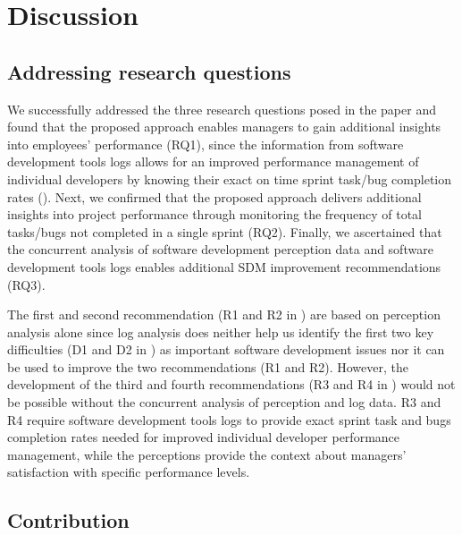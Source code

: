 \section{Discussion}

\subsection{Addressing research questions}

We successfully addressed the three research questions posed in the paper and found that the proposed approach enables managers to gain additional insights into employees’ performance (RQ1), since the information from software development tools logs allows for an improved performance management of individual developers by knowing their exact on time sprint task/bug completion rates (). Next, we confirmed that the proposed approach delivers additional insights into project performance through monitoring the frequency of total tasks/bugs not completed in a single sprint (RQ2). Finally, we ascertained that the concurrent analysis of software development perception data and software development tools logs enables additional SDM improvement recommendations (RQ3). 

The first and second recommendation (R1 and R2 in ) are based on perception analysis alone since log analysis does neither help us identify the first two key difficulties (D1 and D2 in ) as important software development issues nor it can be used to improve the two recommendations (R1 and R2). However, the development of the third and fourth recommendations (R3 and R4 in ) would not be possible without the concurrent analysis of perception and log data.  R3 and R4 require software development tools logs to provide exact sprint task and bugs completion rates needed for improved individual developer performance management, while the perceptions provide the context about managers’ satisfaction with specific performance levels.

\subsection{Contribution}

